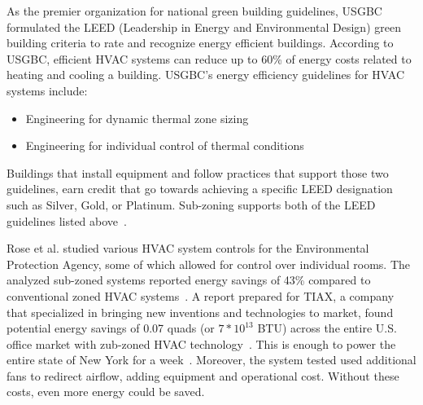 As the premier organization for national green building guidelines,
USGBC~\cite{Council} formulated the LEED (Leadership in Energy and Environmental
Design) green building criteria to rate and recognize energy efficient
buildings. According to USGBC, efficient HVAC systems can reduce up to 60\% of
energy costs related to heating and cooling a building. USGBC's energy
efficiency guidelines for HVAC systems include:
\begin{itemize}
\item Engineering for dynamic thermal zone sizing
\item Engineering for individual control of thermal conditions
\end{itemize}
Buildings that install equipment and follow practices that support those two
guidelines, earn credit that go towards achieving a specific LEED designation
such as Silver, Gold, or Platinum. Sub-zoning supports both of the LEED
guidelines listed above~\cite{Loftness2003}. 

Rose et al. studied various HVAC system controls for the Environmental
Protection Agency, some of which allowed for control over individual rooms. The
analyzed sub-zoned systems reported energy savings of 43\% compared to
conventional zoned HVAC systems~\cite{rose1997epa}. A report prepared for TIAX,
a company that specialized in bringing new inventions and technologies to
market, found potential energy savings of 0.07 quads (or $7*10^{13}$ BTU) across
the entire U.S. office market with zub-zoned HVAC
technology~\cite{llc2002energy}. This is enough to power the entire state of New
York for a week~\cite{EIA2008}. Moreover, the system tested used additional fans
to redirect airflow, adding equipment and operational cost. Without these costs,
even more energy could be saved. 

